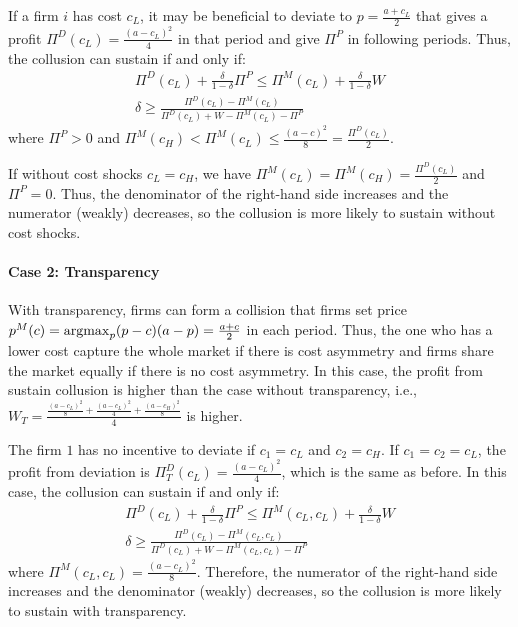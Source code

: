 \documentclass[12pt]{article}
\newcommand{\argmax}{\operatornamewithlimits{argmax}}
\begin{document}
If a firm $i$ has cost $c_L$, it may be beneficial to deviate to $p=\frac{a+c_L}{2}$ that gives a profit $\Pi^D(c_L)=\frac{(a-c_L)^2}{4}$ in that period and give $\Pi^P$ in following periods. Thus, the collusion can sustain if and only if:
\begin{equation}
    \begin{aligned}
        \Pi^D(c_L)+\frac{\delta}{1-\delta}\Pi^P\leq \Pi^M(c_L)+\frac{\delta}{1-\delta}W\\
        \delta\geq\frac{\Pi^D(c_L)-\Pi^M(c_L)}{\Pi^D(c_L)+W-\Pi^M(c_L)-\Pi^P}
        \end{aligned}
        \nonumber
\end{equation}
where $\Pi^P>0$ and $\Pi^M(c_H)<\Pi^M(c_L)\leq\frac{(a-c)^2}{8}=\frac{\Pi^D(c_L)}{2}$.

If without cost shocks $c_L=c_H$, we have $\Pi^M(c_L)=\Pi^M(c_H)=\frac{\Pi^D(c_L)}{2}$ and $\Pi^P=0$. Thus, the denominator of the right-hand side increases and the numerator (weakly) decreases, so the collusion is more likely to sustain without cost shocks.

\paragraph{Case 2: Transparency}
With transparency, firms can form a collision that firms set price $p^M(c)=\argmax_p (p-c)(a-p)=\frac{a+c}{2}$ in each period. Thus, the one who has a lower cost capture the whole market if there is cost asymmetry and firms share the market equally if there is no cost asymmetry. In this case, the profit from sustain collusion is higher than the case without transparency, i.e., $W_T=\frac{\frac{(a-c_L)^2}{8}+\frac{(a-c_L)^2}{4}+\frac{(a-c_H)^2}{8}}{4}$ is higher.

The firm $1$ has no incentive to deviate if $c_1=c_L$ and $c_2=c_H$. If $c_1=c_2=c_L$, the profit from deviation is $\Pi^D_T(c_L)=\frac{(a-c_L)^2}{4}$, which is the same as before. In this case, the collusion can sustain if and only if:
\begin{equation}
    \begin{aligned}
        \Pi^D(c_L)+\frac{\delta}{1-\delta}\Pi^P\leq \Pi^M(c_L,c_L)+\frac{\delta}{1-\delta}W\\
        \delta\geq\frac{\Pi^D(c_L)-\Pi^M(c_L,c_L)}{\Pi^D(c_L)+W-\Pi^M(c_L,c_L)-\Pi^P}
    \end{aligned}
    \nonumber
\end{equation}
where $\Pi^M(c_L,c_L)=\frac{(a-c_L)^2}{8}$. Therefore, the numerator of the right-hand side increases and the denominator (weakly) decreases, so the collusion is more likely to sustain with transparency.
\end{document}
